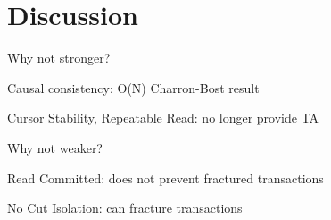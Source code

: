 
\section{Discussion}


Why not stronger?

Causal consistency: O(N) Charron-Bost result

Cursor Stability, Repeatable Read: no longer provide TA

Why not weaker?

Read Committed: does not prevent fractured transactions 

No Cut Isolation: can fracture transactions 

